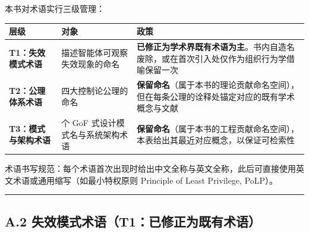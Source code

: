 本书对术语实行三级管理：

{\def\LTcaptype{} %
\begin{longtable}[]{@{}
  >{\raggedright\arraybackslash}p{}
  >{\raggedright\arraybackslash}p{}
  >{\raggedright\arraybackslash}p{}@{}}
\toprule\noalign{}
\begin{minipage}[b]{\linewidth}\raggedright
层级
\end{minipage} & \begin{minipage}[b]{\linewidth}\raggedright
对象
\end{minipage} & \begin{minipage}[b]{\linewidth}\raggedright
政策
\end{minipage} \\
\midrule\noalign{}
\endhead
\bottomrule\noalign{}
\endlastfoot
\textbf{T1：失效模式术语} & 描述智能体可观察失效现象的命名 &
\textbf{已修正为学术界既有术语为主}。书内自造名废除，或在首次引入处仅作为组织行为学借喻保留一次 \\
\textbf{T2：公理体系术语} & 四大控制论公理的命名 &
\textbf{保留命名}（属于本书的理论贡献命名空间），但在每条公理的诠释处锚定对应的既有学术概念与文献 \\
\textbf{T3：模式与架构术语} & 22 个 GoF 式设计模式名与系统架构术语 &
\textbf{保留命名}（属于本书的工程贡献命名空间），本表给出其最近对应概念，以保证可检索性 \\
\end{longtable}
}

术语书写规范：每个术语首次出现时给出中文全称与英文全称，此后可直接使用英文术语或通用缩写（如最小特权原则
Principle of Least Privilege, PoLP）。

\begin{center}\rule{0.5\linewidth}{0.5pt}\end{center}

\subsection{A.2
失效模式术语（T1：已修正为既有术语）}\label{a.2-ux5931ux6548ux6a21ux5f0fux672fux8bedt1ux5df2ux4feeux6b63ux4e3aux65e2ux6709ux672fux8bed}

